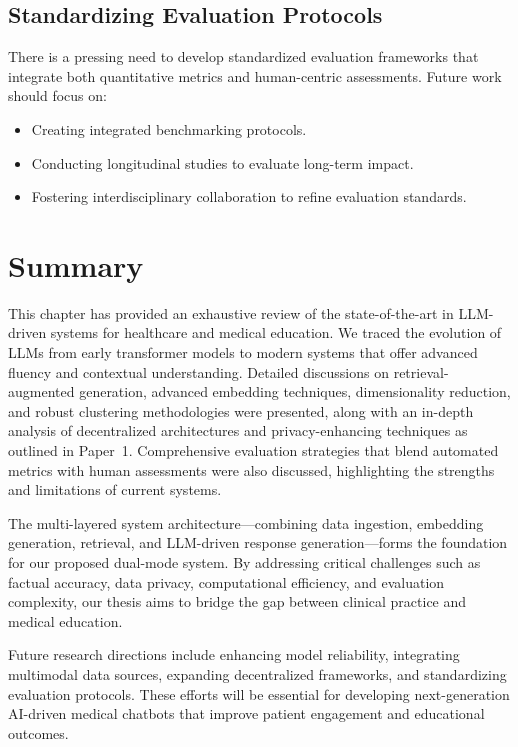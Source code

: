 \subsection{Standardizing Evaluation Protocols}
There is a pressing need to develop standardized evaluation frameworks that integrate both quantitative metrics and human-centric assessments. Future work should focus on:
\begin{itemize}
    \item Creating integrated benchmarking protocols.
    \item Conducting longitudinal studies to evaluate long-term impact.
    \item Fostering interdisciplinary collaboration to refine evaluation standards.
\end{itemize}

\section{Summary}
This chapter has provided an exhaustive review of the state-of-the-art in LLM-driven systems for healthcare and medical education. We traced the evolution of LLMs from early transformer models to modern systems that offer advanced fluency and contextual understanding. Detailed discussions on retrieval-augmented generation, advanced embedding techniques, dimensionality reduction, and robust clustering methodologies were presented, along with an in-depth analysis of decentralized architectures and privacy-enhancing techniques as outlined in Paper~1. Comprehensive evaluation strategies that blend automated metrics with human assessments were also discussed, highlighting the strengths and limitations of current systems.

The multi-layered system architecture—combining data ingestion, embedding generation, retrieval, and LLM-driven response generation—forms the foundation for our proposed dual-mode system. By addressing critical challenges such as factual accuracy, data privacy, computational efficiency, and evaluation complexity, our thesis aims to bridge the gap between clinical practice and medical education.

Future research directions include enhancing model reliability, integrating multimodal data sources, expanding decentralized frameworks, and standardizing evaluation protocols. These efforts will be essential for developing next-generation AI-driven medical chatbots that improve patient engagement and educational outcomes.

\clearpage
